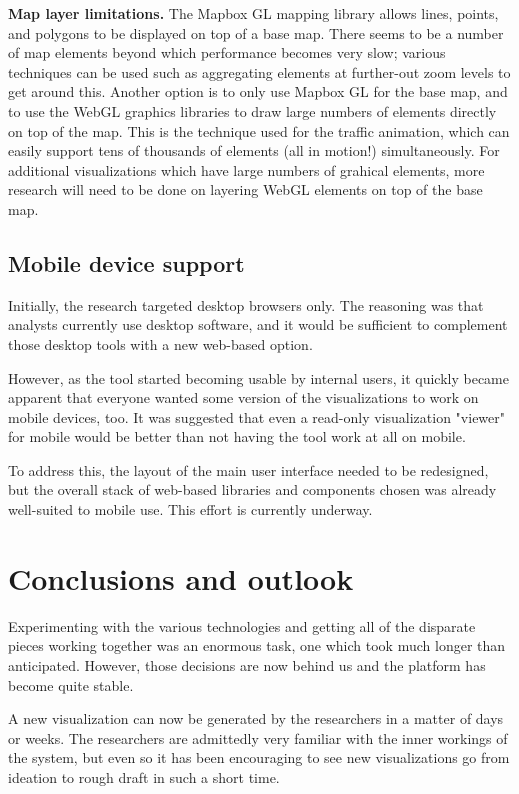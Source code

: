 \documentclass[Afour,sagev,times]{sagej}
\begin{document}
\textbf{Map layer limitations.} The Mapbox GL mapping library allows lines, points, and polygons to be displayed on top of a base map. There seems to be a number of map elements beyond which performance becomes very slow; various techniques can be used such as aggregating elements at further-out zoom levels to get around this. Another option is to only use Mapbox GL for the base map, and to use the WebGL graphics libraries to draw large numbers of elements directly on top of the map. This is the technique used for the traffic animation, which can easily support tens of thousands of elements (all in motion!) simultaneously. For additional visualizations which have large numbers of grahical elements, more research will need to be done on layering WebGL elements on top of the base map.

\subsection{Mobile device support}

Initially, the research targeted desktop browsers only. The reasoning was that analysts currently use desktop software, and it would be sufficient to complement those desktop tools with a new web-based option.

However, as the tool started becoming usable by internal users, it quickly became apparent that everyone wanted some version of the visualizations to work on mobile devices, too. It was suggested that even a read-only visualization "viewer" for mobile would be better than not having the tool work at all on mobile.

To address this, the layout of the main user interface needed to be redesigned, but the overall stack of web-based libraries and components chosen was already well-suited to mobile use. This effort is currently underway.

\section{Conclusions and outlook}

Experimenting with the various technologies and getting all of the disparate pieces working together was an enormous task, one which took much longer than anticipated. However, those decisions are now behind us and the platform has become quite stable.

A new visualization can now be generated by the researchers in a matter of days or weeks. The researchers are admittedly very familiar with the inner workings of the system, but even so it has been encouraging to see new visualizations go from ideation to rough draft in such a short time.
\end{document}
